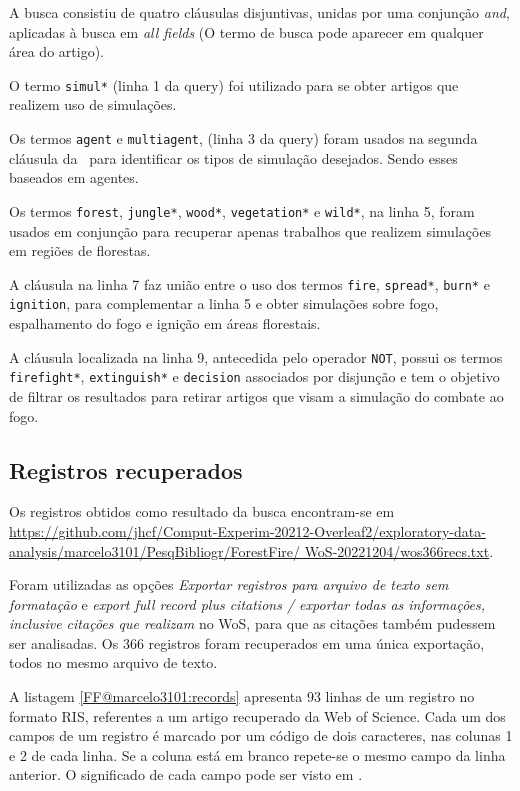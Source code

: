 A busca consistiu de quatro cláusulas disjuntivas, unidas por uma conjunção \textit{and}, aplicadas à busca em \textit{all fields} (O termo de busca pode aparecer em qualquer área do artigo).

O termo \texttt{simul*} (linha 1 da query) foi utilizado para se obter artigos que realizem uso de simulações. 

Os termos \texttt{agent} e \texttt{multiagent},  (linha 3 da query) foram usados na segunda cláusula da \query\  para identificar os tipos de simulação desejados. Sendo esses baseados em agentes.

Os termos  \texttt{forest}, \texttt{jungle*}, \texttt{wood*}, \texttt{vegetation*} e \texttt{wild*}, na linha 5, foram usados em conjunção para recuperar apenas trabalhos que realizem simulações em regiões de florestas. 

A cláusula na linha 7 faz união entre o uso dos termos \texttt{fire}, \texttt{spread*}, \texttt{burn*} e \texttt{ignition}, para complementar a linha 5 e obter simulações sobre fogo, espalhamento do fogo e ignição em áreas florestais.

A cláusula localizada na linha 9,  antecedida pelo operador \texttt{NOT}, possui os termos \texttt{firefight*}, \texttt{extinguish*} e \texttt{decision} associados por disjunção e tem o objetivo de filtrar os resultados para retirar artigos que visam a simulação do combate ao fogo.

\subsection{Registros recuperados}

Os registros obtidos como resultado da busca encontram-se em \url{https://github.com/jhcf/Comput-Experim-20212-Overleaf2/exploratory-data-analysis/marcelo3101/PesqBibliogr/ForestFire/ WoS-20221204/wos366recs.txt}. 

Foram utilizadas as opções \textit{Exportar registros para arquivo de texto sem formatação} e \textit{export full record plus citations / exportar todas as informações, inclusive citações que realizam} no WoS, para que as citações também pudessem ser analisadas. Os 366 registros foram recuperados em uma única exportação, todos no mesmo arquivo de texto.

A listagem \ref{FF@marcelo3101:records} apresenta 93 linhas de um registro no formato RIS, referentes a um artigo recuperado da Web of Science. Cada um dos campos de um registro é marcado por um código de dois caracteres, nas colunas 1 e 2 de cada linha. Se a coluna está em branco repete-se o mesmo campo da linha anterior.
O significado de cada campo pode ser visto em \citep{wikipedia_ris_2017}.

